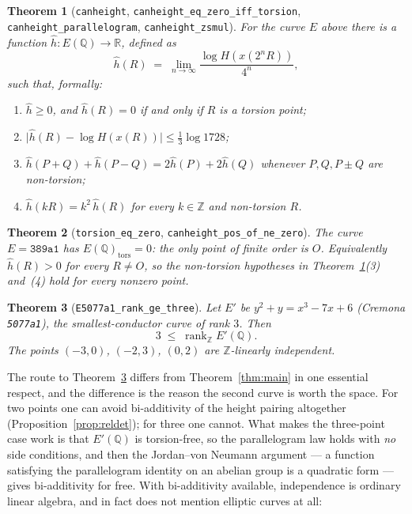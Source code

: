\documentclass[11pt,reqno]{amsart}
\theoremstyle{plain}
\newtheorem{theorem}{Theorem}[section]
\theoremstyle{definition}
\theoremstyle{remark}
\DeclareRobustCommand{\lt}[1]{\texttt{#1}}
\newcommand{\hh}{\widehat{h}}
\newcommand{\nh}{H}
\begin{document}
\begin{theorem}[\lt{canheight}, \lt{canheight\_eq\_zero\_iff\_torsion},
\lt{canheight\_parallelogram}, \lt{canheight\_zsmul}]\label{thm:height}
For the curve $E$ above there is a function
$\hh \colon E(\mathbb{Q}) \to \mathbb{R}$, defined as
\[
  \hh(R) \;=\; \lim_{n \to \infty} \frac{\log \nh\!\left(x(2^n R)\right)}{4^n},
\]
such that, formally:
\begin{enumerate}[label=\textup{(\arabic*)}]
  \item $\hh \ge 0$, and $\hh(R) = 0$ if and only if $R$ is a torsion point;
  \item $\lvert \hh(R) - \log \nh(x(R)) \rvert \le \tfrac13\log 1728$;
  \item $\hh(P+Q) + \hh(P-Q) = 2\hh(P) + 2\hh(Q)$ whenever
        $P, Q, P \pm Q$ are non-torsion;
  \item $\hh(kR) = k^2\,\hh(R)$ for every $k \in \mathbb{Z}$ and non-torsion
        $R$.
\end{enumerate}
\end{theorem}

\begin{theorem}[\lt{torsion\_eq\_zero}, \lt{canheight\_pos\_of\_ne\_zero}]
\label{thm:torsfree}
The curve $E = \mathtt{389a1}$ has $E(\mathbb{Q})_{\mathrm{tors}} = 0$:
the only point of finite order is $O$. Equivalently $\hh(R) > 0$ for every
$R \ne O$, so the non-torsion hypotheses in Theorem~\ref{thm:height}(3)
and~(4) hold for every nonzero point.
\end{theorem}

\begin{theorem}[\lt{E5077a1\_rank\_ge\_three}]\label{thm:main3}
Let $E' $ be $y^2+y = x^3-7x+6$ (Cremona \texttt{5077a1}), the
smallest-conductor curve of rank $3$. Then
\[
  3 \;\le\; \operatorname{rank}_{\mathbb{Z}} E'(\mathbb{Q}).
\]
The points $(-3,0)$, $(-2,3)$, $(0,2)$ are $\mathbb{Z}$-linearly independent.
\end{theorem}

The route to Theorem~\ref{thm:main3} differs from Theorem~\ref{thm:main} in one
essential respect, and the difference is the reason the second curve is worth
the space. For two points one can avoid bi-additivity of the height pairing
altogether (Proposition~\ref{prop:reldet}); for three one cannot. What makes
the three-point case work is that $E'(\mathbb{Q})$ is torsion-free, so the
parallelogram law holds with \emph{no} side conditions, and then the
Jordan--von Neumann argument --- a function satisfying the parallelogram
identity on an abelian group is a quadratic form --- gives bi-additivity for
free. With bi-additivity available, independence is ordinary linear algebra,
and in fact does not mention elliptic curves at all:
\end{document}
